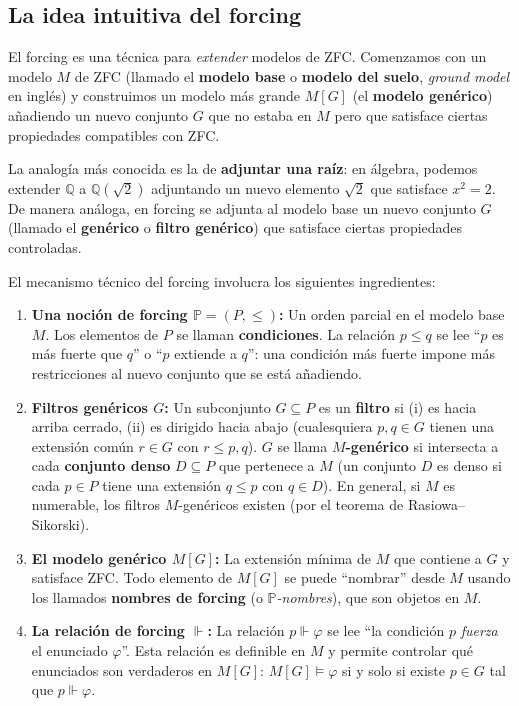 \subsection{La idea intuitiva del forcing}

El forcing es una técnica para \emph{extender} modelos de ZFC. Comenzamos con un modelo $M$ de ZFC (llamado el \textbf{modelo base} o \textbf{modelo del suelo}, \emph{ground model} en inglés) y construimos un modelo más grande $M[G]$ (el \textbf{modelo genérico}) añadiendo un nuevo conjunto $G$ que no estaba en $M$ pero que satisface ciertas propiedades compatibles con ZFC.

La analogía más conocida es la de \textbf{adjuntar una raíz}: en álgebra, podemos extender $\mathbb{Q}$ a $\mathbb{Q}(\sqrt{2})$ adjuntando un nuevo elemento $\sqrt{2}$ que satisface $x^2 = 2$. De manera análoga, en forcing se adjunta al modelo base un nuevo conjunto $G$ (llamado el \textbf{genérico} o \textbf{filtro genérico}) que satisface ciertas propiedades controladas.

El mecanismo técnico del forcing involucra los siguientes ingredientes:

\begin{enumerate}[leftmargin=2em, label=\textbf{(\arabic*)}]
  \item \textbf{Una noción de forcing $\mathbb{P} = (P, \leq)$:} Un orden parcial en el modelo base $M$. Los elementos de $P$ se llaman \textbf{condiciones}. La relación $p \leq q$ se lee ``$p$ es más fuerte que $q$'' o ``$p$ extiende a $q$'': una condición más fuerte impone más restricciones al nuevo conjunto que se está añadiendo.

  \item \textbf{Filtros genéricos $G$:} Un subconjunto $G \subseteq P$ es un \textbf{filtro} si (i) es hacia arriba cerrado, (ii) es dirigido hacia abajo (cualesquiera $p, q \in G$ tienen una extensión común $r \in G$ con $r \leq p, q$). $G$ se llama \textbf{$M$-genérico} si intersecta a cada \textbf{conjunto denso} $D \subseteq P$ que pertenece a $M$ (un conjunto $D$ es denso si cada $p \in P$ tiene una extensión $q \leq p$ con $q \in D$). En general, si $M$ es numerable, los filtros $M$-genéricos existen (por el teorema de Rasiowa--Sikorski).

  \item \textbf{El modelo genérico $M[G]$:} La extensión mínima de $M$ que contiene a $G$ y satisface ZFC. Todo elemento de $M[G]$ se puede ``nombrar'' desde $M$ usando los llamados \textbf{nombres de forcing} (o \emph{$\mathbb{P}$-nombres}), que son objetos en $M$.

  \item \textbf{La relación de forcing $\Vdash$:} La relación $p \Vdash \varphi$ se lee ``la condición $p$ \emph{fuerza} el enunciado $\varphi$''. Esta relación es definible en $M$ y permite controlar qué enunciados son verdaderos en $M[G]$: $M[G] \models \varphi$ si y solo si existe $p \in G$ tal que $p \Vdash \varphi$.
\end{enumerate}

